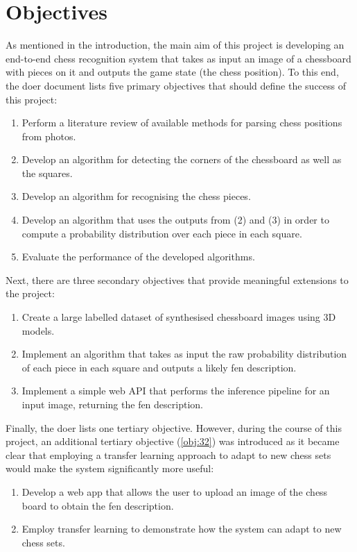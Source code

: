 \section{Objectives}
\label{sec:objectives}
As mentioned in the introduction, the main aim of this project is developing an end-to-end chess recognition system that takes as input an image of a chessboard with pieces on it and outputs the game state (the chess position).
To this end, the \gls{doer} document lists five primary objectives that should define the success of this project:
\begin{enumerate}[label={A\arabic*.},ref={A\arabic*}]
    \item \label{obj:11} Perform a literature review of available methods for parsing chess positions from photos.
    \item \label{obj:12} Develop an algorithm for detecting the corners of the chessboard as well as the squares.
    \item \label{obj:13} Develop an algorithm for recognising the chess pieces.
    \item \label{obj:14} Develop an algorithm that uses the outputs from (2) and (3) in order to compute a probability distribution over each piece in each square.
    \item \label{obj:15} Evaluate the performance of the developed algorithms.
\end{enumerate}

Next, there are three secondary objectives that provide meaningful extensions to the project:
\begin{enumerate}[label={B\arabic*.},ref={B\arabic*}]
    \item \label{obj:21} Create a large labelled dataset of synthesised chessboard images using 3D models.
    \item \label{obj:22} Implement an algorithm that takes as input the raw probability distribution of each piece in each square and outputs a likely \gls{fen} description.
    \item \label{obj:23} Implement a simple web API that performs the inference pipeline for an input image, returning the \gls{fen} description. 
\end{enumerate}

Finally, the \gls{doer} lists one tertiary objective. 
However, during the course of this project, an additional tertiary objective (\ref{obj:32}) was introduced as it became clear that employing a transfer learning approach to adapt to new chess sets would make the system significantly more useful:
\begin{enumerate}[label={C\arabic*.},ref={C\arabic*}]
    \item \label{obj:31} Develop a web app that allows the user to upload an image of the chess board to obtain the \gls{fen} description.
    \item \label{obj:32} Employ transfer learning to demonstrate how the system can adapt to new chess sets.
\end{enumerate}

